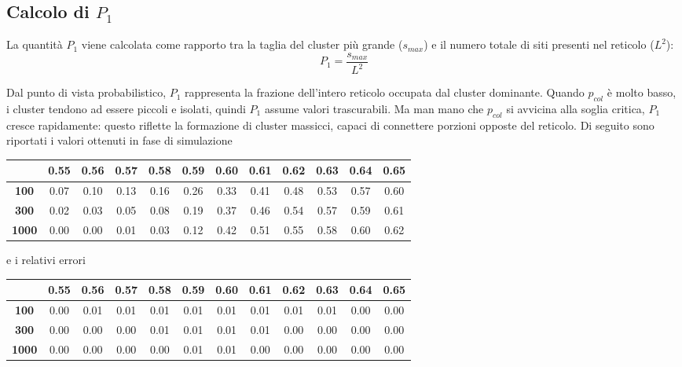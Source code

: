 \subsection{Calcolo di $P_{1}$}

La quantità $P_1$ viene calcolata come rapporto tra la taglia del cluster più grande ($s_{max}$) e il numero totale di siti presenti nel reticolo ($L^2$):
\vspace{4px}
\begin{equation}
	P_1 = \frac{s_{max}}{L^2}
\end{equation}

\vspace{4px}
\noindent
Dal punto di vista probabilistico, $P_1$ rappresenta la frazione dell'intero reticolo occupata dal cluster dominante. Quando $p_{col}$ è molto basso, i cluster tendono ad essere piccoli e isolati, quindi $P_1$ assume valori trascurabili. Ma man mano che $p_{col}$ si avvicina alla soglia critica, $P_1$ cresce rapidamente: questo riflette la formazione di cluster massicci, capaci di connettere porzioni opposte del reticolo. Di seguito sono riportati i valori ottenuti in fase di simulazione

\vspace{15px}
\noindent
\begin{tabular}{|c|*{11}{c|}}
	\hline
	\textbf{} & \textbf{0.55} & \textbf{0.56} & \textbf{0.57} & \textbf{0.58} & \textbf{0.59} & \textbf{0.60} & \textbf{0.61} & \textbf{0.62} & \textbf{0.63} & \textbf{0.64} & \textbf{0.65} \\
	\hline
	\textbf{100}  & 0.07 & 0.10 & 0.13 & 0.16 & 0.26 & 0.33 & 0.41 & 0.48 & 0.53 & 0.57 & 0.60 \\
	\hline
	\textbf{300}  & 0.02 & 0.03 & 0.05 & 0.08 & 0.19 & 0.37 & 0.46 & 0.54 & 0.57 & 0.59 & 0.61 \\
	\hline
	\textbf{1000} & 0.00 & 0.00 & 0.01 & 0.03 & 0.12 & 0.42 & 0.51 & 0.55 & 0.58 & 0.60 & 0.62 \\
	\hline
\end{tabular}

\vspace{15px}
\noindent
e i relativi errori

\vspace{15px}
\noindent
\begin{tabular}{|c|*{11}{c|}}
	\hline
	\textbf{} & \textbf{0.55} & \textbf{0.56} & \textbf{0.57} & \textbf{0.58} & \textbf{0.59} & \textbf{0.60} & \textbf{0.61} & \textbf{0.62} & \textbf{0.63} & \textbf{0.64} & \textbf{0.65} \\
	\hline
	\textbf{100}  & 0.00 & 0.01 & 0.01 & 0.01 & 0.01 & 0.01 & 0.01 & 0.01 & 0.01 & 0.00 & 0.00 \\
	\hline
	\textbf{300}  & 0.00 & 0.00 & 0.00 & 0.01 & 0.01 & 0.01 & 0.01 & 0.00 & 0.00 & 0.00 & 0.00 \\
	\hline
	\textbf{1000} & 0.00 & 0.00 & 0.00 & 0.00 & 0.01 & 0.01 & 0.00 & 0.00 & 0.00 & 0.00 & 0.00 \\
	\hline
\end{tabular}

